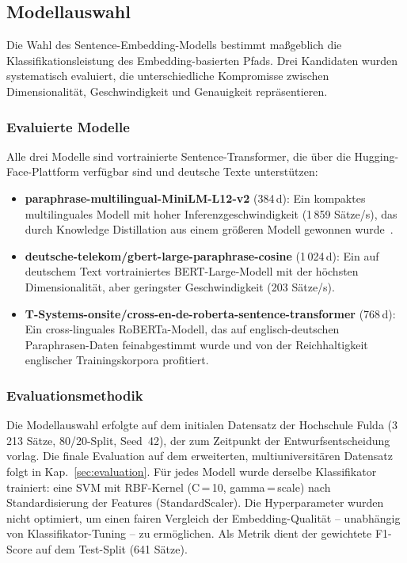 \subsection{Modellauswahl}\label{sec:modellauswahl}

Die Wahl des Sentence-Embedding-Modells bestimmt maßgeblich die Klassifikationsleistung des Embedding-basierten Pfads.
Drei Kandidaten wurden systematisch evaluiert, die unterschiedliche Kompromisse zwischen Dimensionalität, Geschwindigkeit und Genauigkeit repräsentieren.

\subsubsection{Evaluierte Modelle}\label{sec:eval-modelle}

Alle drei Modelle sind vortrainierte Sentence-Transformer, die über die Hugging-Face-Plattform verfügbar sind und deutsche Texte unterstützen:

\begin{itemize}
  \item \textbf{paraphrase-multilingual-MiniLM-L12-v2} (384\,d): Ein kompaktes multilinguales Modell mit hoher Inferenzgeschwindigkeit (1\,859 Sätze/s), das durch Knowledge Distillation aus einem größeren Modell gewonnen wurde~\cite{reimers2020multilingual}.
  \item \textbf{deutsche-telekom/gbert-large-paraphrase-cosine} (1\,024\,d): Ein auf deutschem Text vortrainiertes BERT-Large-Modell mit der höchsten Dimensionalität, aber geringster Geschwindigkeit (203 Sätze/s).
  \item \textbf{T-Systems-onsite/cross-en-de-roberta-sentence-transformer} (768\,d): Ein cross-linguales RoBERTa-Modell, das auf englisch-deutschen Paraphrasen-Daten feinabgestimmt wurde und von der Reichhaltigkeit englischer Trainingskorpora profitiert.
\end{itemize}

\subsubsection{Evaluationsmethodik}\label{sec:eval-methodik-modelle}

Die Modellauswahl erfolgte auf dem initialen Datensatz der Hochschule Fulda (3\,213 Sätze, 80/20-Split, Seed~42), der zum Zeitpunkt der Entwurfsentscheidung vorlag.
Die finale Evaluation auf dem erweiterten, multiuniversitären Datensatz folgt in Kap.~\ref{sec:evaluation}.
Für jedes Modell wurde derselbe Klassifikator trainiert: eine SVM mit RBF-Kernel (C\,=\,10, gamma\,=\,scale) nach Standardisierung der Features (StandardScaler).
Die Hyperparameter wurden nicht optimiert, um einen fairen Vergleich der Embedding-Qualität -- unabhängig von Klassifikator-Tuning -- zu ermöglichen.
Als Metrik dient der gewichtete F1-Score auf dem Test-Split (641 Sätze).

